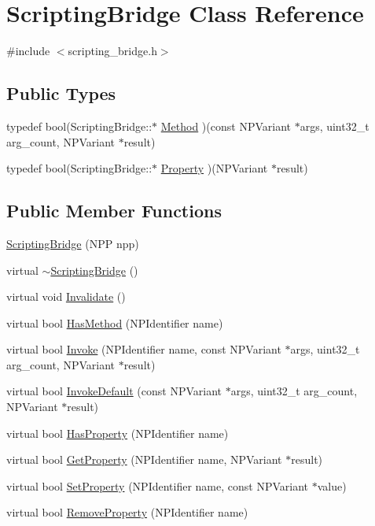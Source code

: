 \hypertarget{class_scripting_bridge}{
\section{ScriptingBridge Class Reference}
\label{class_scripting_bridge}
}


{\ttfamily \#include $<$scripting\_\-bridge.h$>$}

\subsection*{Public Types}
\begin{DoxyCompactItemize}
\item 
typedef bool(ScriptingBridge::$\ast$ \hyperlink{class_scripting_bridge_a53de202658094d3663f4c330bb096291}{Method} )(const NPVariant $\ast$args, uint32\_\-t arg\_\-count, NPVariant $\ast$result)
\item 
typedef bool(ScriptingBridge::$\ast$ \hyperlink{class_scripting_bridge_afe9032a0f312e1f440f8fed19ffe64d7}{Property} )(NPVariant $\ast$result)
\end{DoxyCompactItemize}
\subsection*{Public Member Functions}
\begin{DoxyCompactItemize}
\item 
\hyperlink{class_scripting_bridge_ae743ff1b8ffce6889a86a73500fd0da1}{ScriptingBridge} (NPP npp)
\item 
virtual \hyperlink{class_scripting_bridge_a8e85d3e7803f38a7182ac2be45d45a4d}{$\sim$ScriptingBridge} ()
\item 
virtual void \hyperlink{class_scripting_bridge_a9ee60d17b25c9b968315b6a12a55d841}{Invalidate} ()
\item 
virtual bool \hyperlink{class_scripting_bridge_a7eafa4200bb68bf6632c6b635aa4953f}{HasMethod} (NPIdentifier name)
\item 
virtual bool \hyperlink{class_scripting_bridge_a8c6d388d7c7e1660b267013143d0cdf5}{Invoke} (NPIdentifier name, const NPVariant $\ast$args, uint32\_\-t arg\_\-count, NPVariant $\ast$result)
\item 
virtual bool \hyperlink{class_scripting_bridge_a9045116428a296ea7073ffbdce73d80e}{InvokeDefault} (const NPVariant $\ast$args, uint32\_\-t arg\_\-count, NPVariant $\ast$result)
\item 
virtual bool \hyperlink{class_scripting_bridge_a425cfcd308f30736bf936f2e0aca1d6c}{HasProperty} (NPIdentifier name)
\item 
virtual bool \hyperlink{class_scripting_bridge_ac971765b22d611a0e0661a523650885d}{GetProperty} (NPIdentifier name, NPVariant $\ast$result)
\item 
virtual bool \hyperlink{class_scripting_bridge_aee815679c5b398c1d288322d6b21e81d}{SetProperty} (NPIdentifier name, const NPVariant $\ast$value)
\item 
virtual bool \hyperlink{class_scripting_bridge_a4948d9d87de0dc58627c8b377356df34}{RemoveProperty} (NPIdentifier name)
\end{DoxyCompactItemize}
